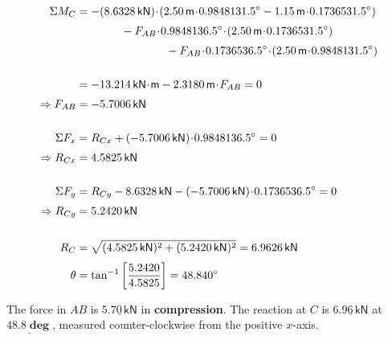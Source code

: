 \documentclass[10pt,oneside]{article}
\begin{document}
\begin{textblock*}{6.75in}
    \begin{align*}
      \Sigma M_C &= -(8.6328\,\textsf{kN})\cd (2.50\,\textsf{m}\cd\cos 31.5\deg - 1.15\,\textsf{m}\cd\sin 31.5\deg) \\[0.25em]
      & \qquad\qquad - F_{AB}\cd\cos 36.5\deg\cd(2.50\,\textsf{m}\cd\sin 31.5\deg) \\[0.25em]
      & \qquad\qquad\qquad\qquad - F_{AB}\cd\sin 36.5\deg\cd(2.50\,\textsf{m}\cd\cos 31.5\deg) \\\\
      &= -13.214\,\mathsf{kN\cd m} - 2.3180\,\textsf{m}\cd F_{AB} = 0 \\[0.25em]
      \Ra F_{AB} &= - 5.7006\,\textsf{kN} \\\\
      \Sigma F_x &= R_{Cx}+(-5.7006\,\textsf{kN})\cd\cos 36.5\deg = 0 \\[0.25em]
      \Ra R_{Cx} &= 4.5825\,\textsf{kN} \\\\
      \Sigma F_y &= R_{Cy}-8.6328\,\textsf{kN} -(-5.7006\,\textsf{kN})\cd\sin 36.5\deg = 0 \\[0.25em]
      \Ra R_{Cy} &= 5.2420\,\textsf{kN} \\\\
      R_C &= \sqrt{(4.5825\,\textsf{kN})^2+(5.2420\,\textsf{kN})^2} = 6.9626\,\textsf{kN} \\[0.25em]
      \theta &= \tan^{-1}\left[\frac{5.2420}{4.5825}\right] = 48.840\deg      
    \end{align*}

    \pars\large\centering
      The force in $AB$ is $\underline{\bm{5.70\,\mathsf{kN}}}$ in {\bf compression}.      
      \parm      
      The reaction at $C$ is $\underline{\bm{6.96\,\mathsf{kN}}}$ at  $\underline{\bm{48.8\deg}}$, measured counter-clockwise from the positive $x$-axis.

\end{textblock*}

\end{document}
